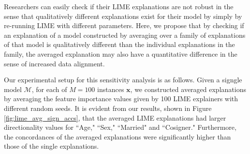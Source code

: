 \documentclass[mnsc,blindrev]{informs3}
\begin{document}
        Researchers can easily check if their LIME explanations are not robust in the sense that qualitatively different explanations exist for their model by simply by re-running LIME with different parameters. Here, we propose that by checking if an explanation of a model constructed by averaging over a family of explanations of that model is qualitatively different than the individual explanations in the family, the averaged explanation may also have a quantitative difference in the sense of increased data alignment.
        
        Our experimental setup for this sensitivity analysis is as follows. Given a signgle model $\mathcal{M}$, for each of $M=100$ instances $\mathbf{x}$, we constructed averaged explanations by averaging the feature importance values given by 100 LIME explainers with different random seeds.
            It is evident from our results, shown in Figure \ref{fig:lime_avg_sign_accs}, that the averaged LIME explanations had larger directionality values for ``Age," ``Sex," ``Married" and ``Cosigner." %
            Furthermore, the concordances of the averaged explanations were significantly higher than those of the single explanations. %
\end{document}
